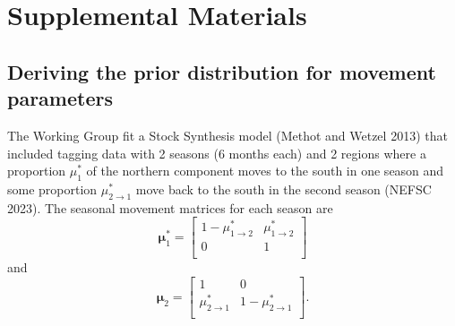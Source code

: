 \documentclass[
]{article}
\begin{document}
\setcounter{table}{0}
\renewcommand\thetable{A\arabic{table}}


\pagebreak

\hypertarget{supplemental-materials}{%
\section*{Supplemental Materials}\label{supplemental-materials}}

\hypertarget{deriving-the-prior-distribution-for-movement-parameters}{%
\subsection*{Deriving the prior distribution for movement parameters}\label{deriving-the-prior-distribution-for-movement-parameters}}

The Working Group fit a Stock Synthesis model (Methot and Wetzel 2013) that included tagging data with 2 seasons (6 months each) and 2 regions where a proportion \(\mu^*_1\) of the northern component moves to the south in one season and some proportion \(\mu^*_{2\rightarrow 1}\) move back to the south in the second season (NEFSC 2023). The seasonal movement matrices for each season are
\begin{equation*}
\boldsymbol{\mu}^*_{1} = 
  \begin{bmatrix}
     1-\mu^*_{1\rightarrow 2} & \mu^*_{1\rightarrow 2} \\
     0 & 1 \\
  \end{bmatrix}
\end{equation*}
and
\begin{equation*}
\boldsymbol{\mu}_{2} = 
  \begin{bmatrix}
     1 &  0 \\
     \mu^*_{2\rightarrow 1} & 1-\mu^*_{2\rightarrow 1} \\
  \end{bmatrix}.
\end{equation*}
\end{document}
